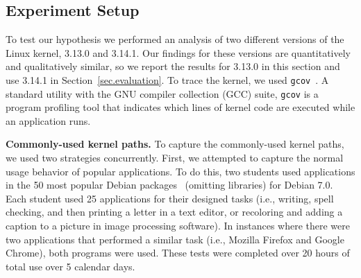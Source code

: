 %
%

\subsection{Experiment Setup}

To test our hypothesis we performed an analysis of two different versions of
the Linux kernel, 3.13.0 and 3.14.1.  Our findings for these
versions are quantitatively and qualitatively similar, so we report 
the results for 3.13.0 in this section and use 3.14.1 in Section~\ref{sec.evaluation}.
To trace the kernel, we used \texttt{gcov}~\cite{gcov}. A standard utility with
the GNU compiler collection (GCC) suite,
\texttt{gcov} is a program profiling tool that indicates which lines of kernel
code are executed while an application runs.

\textbf{Commonly-used kernel paths.}
To capture the commonly-used kernel paths, we used two strategies concurrently.
First, we attempted to capture the normal usage behavior of popular applications.
To do this, two students used
applications in the 50 most popular Debian packages~\cite{Top-Packages}
(omitting libraries) for Debian 7.0.
Each student used 25 applications for their designed
tasks (i.e., writing, spell checking, and then printing a letter in a text
editor, or recoloring and adding a caption to a picture in image processing
software). In instances where there were two applications that performed a
similar task (i.e., Mozilla Firefox and Google Chrome), both programs were
used. These tests were completed over 20 hours of
total use over 5 calendar days.

